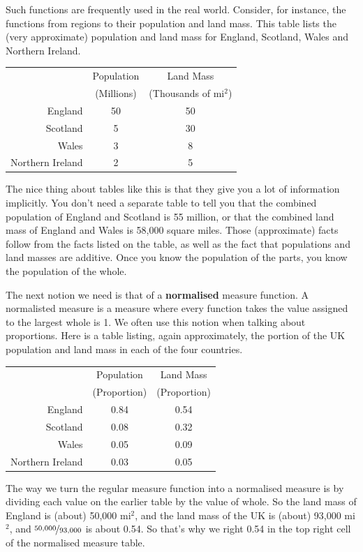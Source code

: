 \documentclass[openany]{book}
\begin{document}
Such functions are frequently used in the real world. Consider, for instance, the functions from regions to their population and land mass. This table lists the (very approximate) population and land mass for England, Scotland, Wales and Northern Ireland.

\begin{center} \begin{tabular}{r c c}
& Population & Land Mass \\
& (Millions) & (Thousands of mi$^2$) \\
England & 50 & 50\\
Scotland & 5 & 30 \\
Wales & 3 & 8\\
Northern Ireland & 2 & 5\\
\end{tabular} \end{center} The nice thing about tables like this is that they give you a lot of information implicitly. You don't need a separate table to tell you that the combined population of England and Scotland is 55 million, or that the combined land mass of England and Wales is 58,000 square miles. Those (approximate) facts follow from the facts listed on the table, as well as the fact that populations and land masses are additive. Once you know the population of the parts, you know the population of the whole.

The next notion we need is that of a \textbf{normalised} measure function. A normalisted measure is a measure where every function takes the value assigned to the largest whole is 1. We often use this notion when talking about proportions. Here is a table listing, again approximately, the portion of the UK population and land mass in each of the four countries.

\begin{center} \begin{tabular}{r c c}
& Population & Land Mass \\
& (Proportion) & (Proportion) \\
England & 0.84 & 0.54\\
Scotland & 0.08 & 0.32\\
Wales & 0.05 & 0.09\\
Northern Ireland & 0.03 & 0.05\\
\end{tabular} \end{center} The way we turn the regular measure function into a normalised measure is by dividing each value on the earlier table by the value of whole. So the land mass of England is (about) 50,000 mi$^2$, and the land mass of the UK is (about) 93,000 mi$^2$, and $\nicefrac{50,000}{93,000}$ is about 0.54. So that's why we right 0.54 in the top right cell of the normalised measure table.
\end{document}
